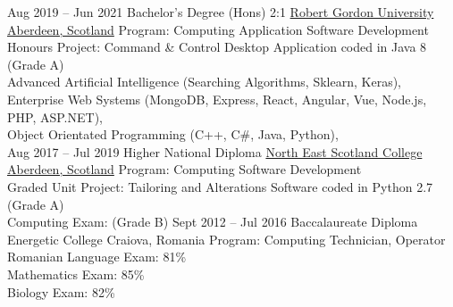 \documentclass[10pt]{Darie-Dragos_Mitoiu_Document.cls}
\begin{document}


    \begin{entrylist}
        \entry
        {Aug 2019 -- Jun 2021}
        {Bachelor's Degree (Hons) 2:1}
        {\href{https://www.rgu.ac.uk}{Robert Gordon University Aberdeen, Scotland}}
        {Program: Computing Application Software Development \\
        Honours Project: Command \& Control Desktop Application coded in Java 8 (Grade A) \\
        Advanced Artificial Intelligence (Searching Algorithms, Sklearn, Keras), \\
        Enterprise Web Systems (MongoDB, Express, React, Angular, Vue, Node.js, PHP, ASP.NET), \\
        Object Orientated Programming (C++, C\#, Java, Python), \\
        }
        \entry
        {Aug 2017 -- Jul 2019}
        {Higher National Diploma}
        {\href{https://www.nescol.ac.uk}{North East Scotland College Aberdeen, Scotland}}
        {Program: Computing Software Development \\
        Graded Unit Project: Tailoring and Alterations Software coded in Python 2.7 (Grade A) \\
        Computing Exam: (Grade B)}
        \entry
        {Sept 2012 -- Jul 2016}
        {Baccalaureate Diploma}
        {Energetic College Craiova, Romania}
        {Program: Computing Technician, Operator \\
        Romanian Language Exam: 81\% \\
        Mathematics Exam: 85\% \\
        Biology Exam: 82\%}
    \end{entrylist}

\end{document}
